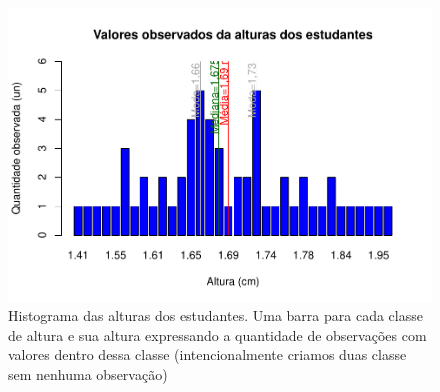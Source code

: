 \documentclass[
]{book}
\newenvironment{Shaded}{\begin{snugshade}}{\end{snugshade}}
\newcommand{\AttributeTok}[1]{\textcolor[rgb]{0.77,0.63,0.00}{#1}}
\newcommand{\DecValTok}[1]{\textcolor[rgb]{0.00,0.00,0.81}{#1}}
\newcommand{\FloatTok}[1]{\textcolor[rgb]{0.00,0.00,0.81}{#1}}
\newcommand{\FunctionTok}[1]{\textcolor[rgb]{0.00,0.00,0.00}{#1}}
\newcommand{\NormalTok}[1]{#1}
\newcommand{\OtherTok}[1]{\textcolor[rgb]{0.56,0.35,0.01}{#1}}
\newcommand{\SpecialCharTok}[1]{\textcolor[rgb]{0.00,0.00,0.00}{#1}}
\newcommand{\StringTok}[1]{\textcolor[rgb]{0.31,0.60,0.02}{#1}}
\begin{document}
\hfill\break

\begin{Shaded}
\end{Shaded}

\begin{figure}
\centering
\includegraphics{apostila_files/figure-latex/unnamed-chunk-43-1.pdf}
\caption{\label{fig:unnamed-chunk-43}Histograma das alturas dos estudantes. Uma barra para cada classe de altura e sua altura expressando a quantidade de observações com valores dentro dessa classe (intencionalmente criamos duas classe sem nenhuma observação)}
\end{figure}
\end{document}
